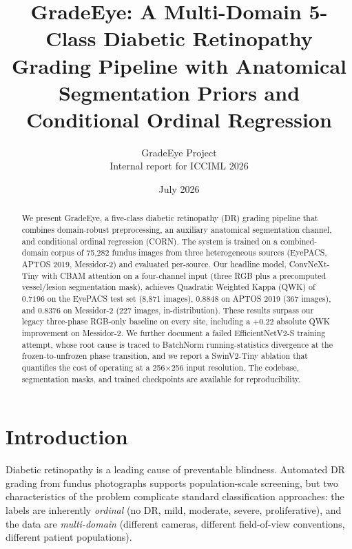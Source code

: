 \documentclass[11pt,a4paper]{article}
\title{GradeEye: A Multi-Domain 5-Class Diabetic Retinopathy Grading Pipeline with Anatomical Segmentation Priors and Conditional Ordinal Regression}
\author{GradeEye Project \\ \small{Internal report for ICCIML 2026}}
\date{July 2026}
\begin{document}
\maketitle

\begin{abstract}
We present GradeEye, a five-class diabetic retinopathy (DR) grading pipeline that combines domain-robust preprocessing, an auxiliary anatomical segmentation channel, and conditional ordinal regression (CORN). The system is trained on a combined-domain corpus of 75{,}282 fundus images from three heterogeneous sources (EyePACS, APTOS 2019, Messidor-2) and evaluated per-source. Our headline model, ConvNeXt-Tiny with CBAM attention on a four-channel input (three RGB plus a precomputed vessel/lesion segmentation mask), achieves Quadratic Weighted Kappa (QWK) of $0.7196$ on the EyePACS test set (8{,}871 images), $0.8848$ on APTOS 2019 (367 images), and $0.8376$ on Messidor-2 (227 images, in-distribution). These results surpass our legacy three-phase RGB-only baseline on every site, including a $+0.22$ absolute QWK improvement on Messidor-2. We further document a failed EfficientNetV2-S training attempt, whose root cause is traced to BatchNorm running-statistics divergence at the frozen-to-unfrozen phase transition, and we report a SwinV2-Tiny ablation that quantifies the cost of operating at a 256$\times$256 input resolution. The codebase, segmentation masks, and trained checkpoints are available for reproducibility.
\end{abstract}

\section{Introduction}

Diabetic retinopathy is a leading cause of preventable blindness. Automated DR grading from fundus photographs supports population-scale screening, but two characteristics of the problem complicate standard classification approaches: the labels are inherently \emph{ordinal} (no DR, mild, moderate, severe, proliferative), and the data are \emph{multi-domain} (different cameras, different field-of-view conventions, different patient populations).
\end{document}
